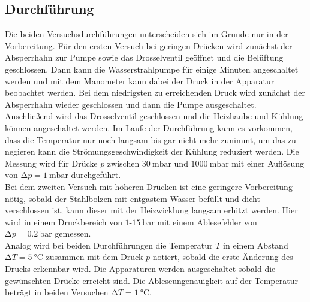 \subsection{Durchführung}
Die beiden Versuchsdurchführungen unterscheiden sich im Grunde nur in der Vorbereitung. Für den ersten Versuch bei geringen Drücken wird zunächst der Absperrhahn zur Pumpe sowie das Drosselventil geöffnet und die Belüftung geschlossen. 
Dann kann die Wasserstrahlpumpe für einige Minuten angeschaltet werden und mit dem Manometer kann dabei der Druck in der Apparatur beobachtet werden. Bei dem niedrigsten zu erreichenden Druck wird zunächst der Absperrhahn wieder geschlossen
und dann die Pumpe ausgeschaltet. Anschließend wird das Drosselventil geschlossen und die Heizhaube und Kühlung können angeschaltet werden.
Im Laufe der Durchführung kann es vorkommen, dass die Temperatur nur noch langsam bis gar nicht mehr zunimmt, um das zu negieren kann die Strömungsgeschwindigkeit der Kühlung reduziert werden.
Die Messung wird für Drücke $p$ zwischen $\SI{30}{\milli\bar}$ und $\SI{1000}{\milli\bar}$ mit einer Auflösung von $\increment p =\SI{1}{\milli\bar}$ durchgeführt.
\newline
\\
Bei dem zweiten Versuch mit höheren Drücken ist eine geringere Vorbereitung nötig, sobald der Stahlbolzen mit entgastem Wasser befüllt und dicht verschlossen ist, kann dieser mit der Heizwicklung langsam erhitzt werden.
Hier wird in einem Druckbereich von $1$-$\SI{15}{\bar}$ mit einem Ablesefehler von $\increment p = \SI{0.2}{\bar}$ gemessen.
\newline
\\
Analog wird bei beiden Durchführungen die Temperatur $T$ in einem Abstand $\increment T = \SI{5}{\celsius}$ zusammen mit dem Druck $p$ notiert, sobald die erste Änderung des Drucks erkennbar wird.
Die Apparaturen werden ausgeschaltet sobald die gewünschten Drücke erreicht sind. Die Ableseungenauigkeit auf der Temperatur beträgt in beiden Versuchen $\increment T = \SI{1}{\celsius}$.